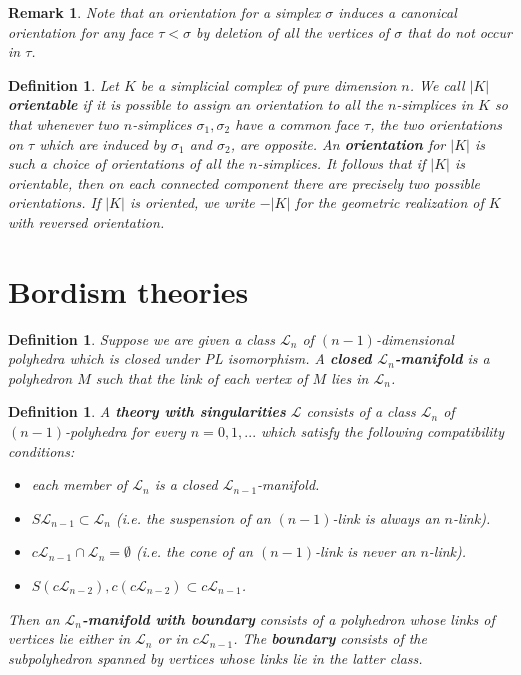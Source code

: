 \documentclass{scrreprt}
\newtheorem{definition}[prop]{Definition}
\newtheorem{remark}[prop]{Remark}
\begin{document}
\begin{remark}
Note that an orientation for a simplex $\sigma$ induces a canonical orientation for any face $\tau < \sigma$ by deletion of all the vertices of $\sigma$ that do not occur in $\tau$.
\end{remark}

\begin{definition}
Let $K$ be a simplicial complex of pure dimension $n$. We call $|K|$ \textbf{orientable} if it is possible to assign an orientation to all the $n$-simplices in $K$ so that whenever two $n$-simplices $\sigma_1, \sigma_2$ have a common face $\tau$, the two orientations on $\tau$ which are induced by $\sigma_1$ and $\sigma_2$, are opposite. An \textbf{orientation} for $|K|$ is such a choice of orientations of all the $n$-simplices. It follows that if $|K|$ is orientable, then on each connected component there are precisely two possible orientations. If $|K|$ is oriented, we write $-|K|$ for the geometric realization of $K$ with reversed orientation.
\end{definition}

\section{Bordism theories}

\begin{definition}
Suppose we are given a class $\mathcal{L}_n$ of $(n-1)$-dimensional polyhedra which is closed under PL isomorphism. A \textbf{closed $\mathcal{L}_n$-manifold} is a polyhedron $M$ such that the link of each vertex of $M$ lies in $\mathcal{L}_n$. 
\end{definition}

\begin{definition}\label{theory}
A \textbf{theory with singularities} $\mathcal{L}$ consists of a class $\mathcal{L}_n$ of $(n-1)$-polyhedra for every $n=0,1,...$ which satisfy the following compatibility conditions:
\begin{itemize}
\item[1.] each member of $\mathcal{L}_n$ is a closed $\mathcal{L}_{n-1}$-manifold.
\item[2.] $S \mathcal{L}_{n-1} \subset \mathcal{L}_n$ (i.e. the suspension of an $(n-1)$-link is always an $n$-link).
\item[3.] $c \mathcal{L}_{n-1} \cap \mathcal{L}_n = \emptyset$ (i.e. the cone of an $(n-1)$-link is never an $n$-link).
\item[4.] $S(c\mathcal{L}_{n-2}), c(c \mathcal{L}_{n-2}) \subset c \mathcal{L}_{n-1}$.
\end{itemize}
Then an \textbf{$\mathcal{L}_n$-manifold with boundary} consists of a polyhedron whose links of vertices lie either in $\mathcal{L}_n$ or in $c \mathcal{L}_{n-1}$. The \textbf{boundary} consists of the subpolyhedron spanned by vertices whose links lie in the latter class.
\end{definition}
\end{document}
